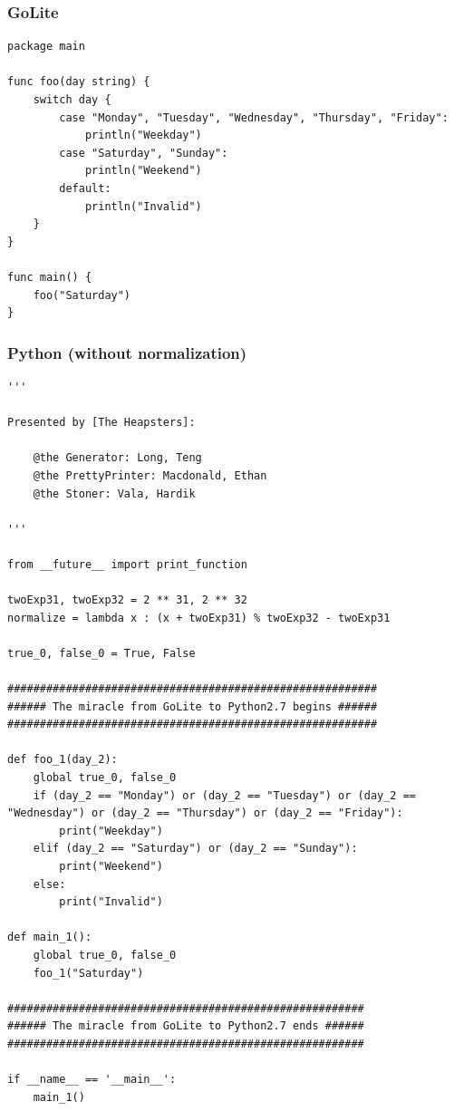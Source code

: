 \documentclass{article}
\begin{document}
\subsubsection{GoLite}
\begin{lstlisting}
package main

func foo(day string) {
    switch day {
        case "Monday", "Tuesday", "Wednesday", "Thursday", "Friday":
            println("Weekday")
        case "Saturday", "Sunday":
            println("Weekend")
        default:
            println("Invalid")
    }
}

func main() {
    foo("Saturday")
}
\end{lstlisting}
\subsubsection{Python (without normalization)}
\begin{lstlisting}
'''

Presented by [The Heapsters]:

	@the Generator: Long, Teng
	@the PrettyPrinter: Macdonald, Ethan
	@the Stoner: Vala, Hardik

'''

from __future__ import print_function

twoExp31, twoExp32 = 2 ** 31, 2 ** 32
normalize = lambda x : (x + twoExp31) % twoExp32 - twoExp31

true_0, false_0 = True, False

#########################################################
###### The miracle from GoLite to Python2.7 begins ######
#########################################################

def foo_1(day_2):
	global true_0, false_0
	if (day_2 == "Monday") or (day_2 == "Tuesday") or (day_2 == "Wednesday") or (day_2 == "Thursday") or (day_2 == "Friday"):
		print("Weekday")
	elif (day_2 == "Saturday") or (day_2 == "Sunday"):
		print("Weekend")
	else:
		print("Invalid")

def main_1():
	global true_0, false_0
	foo_1("Saturday")

#######################################################
###### The miracle from GoLite to Python2.7 ends ######
#######################################################

if __name__ == '__main__':
	main_1()
\end{lstlisting}
\end{document}
